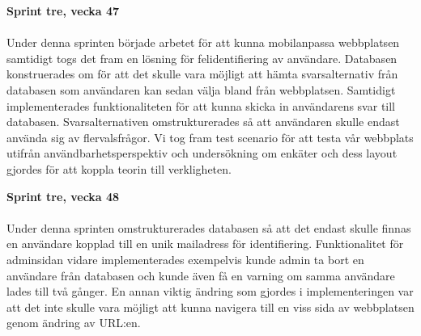 \documentclass[12pt]{article}
\begin{document}
\textbf{Sprint tre, vecka 47} \\\\
Under denna sprinten började arbetet för att kunna mobilanpassa webbplatsen samtidigt togs det fram en lösning för felidentifiering av användare. Databasen konstruerades om för att det skulle vara möjligt att hämta svarsalternativ från databasen som användaren kan sedan välja bland från webbplatsen. Samtidigt implementerades funktionaliteten för att kunna skicka in användarens svar till databasen. Svarsalternativen omstrukturerades så att användaren skulle endast använda sig av flervalsfrågor. Vi tog fram test scenario för att testa vår webbplats utifrån användbarhetsperspektiv och undersökning om enkäter och dess layout gjordes för att koppla teorin till verkligheten.

\textbf{Sprint tre, vecka 48} \\\\
Under denna sprinten omstrukturerades databasen så att det endast skulle finnas en användare kopplad till en unik mailadress för identifiering. Funktionalitet för adminsidan vidare implementerades exempelvis kunde admin ta bort en användare från databasen och kunde även få en varning om samma användare lades till två gånger. En annan viktig ändring som gjordes i implementeringen var att det inte skulle vara möjligt att kunna navigera till en viss sida av webbplatsen genom ändring av URL:en. 
\end{document}

